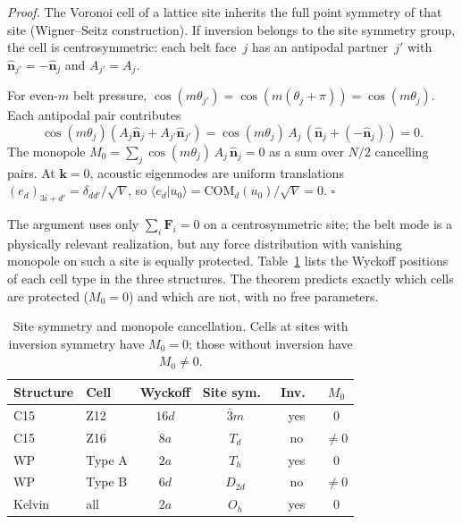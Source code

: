 \documentclass[12pt]{article}
\newcommand{\vk}{\bm{k}}
\newcommand{\vn}{\hat{\bm{n}}}
\newcommand{\vF}{\bm{F}}
\begin{document}
\emph{Proof.}  The Voronoi cell of a lattice site inherits the full
point symmetry of that site (Wigner--Seitz construction).  If
inversion belongs to the site symmetry group, the cell is
centrosymmetric: each belt face~$j$ has an antipodal partner~$j'$ with
$\vn_{j'} = -\vn_j$ and $A_{j'} = A_j$.

For even-$m$ belt pressure, $\cos(m\theta_{j'}) = \cos(m(\theta_j +
\pi)) = \cos(m\theta_j)$.  Each antipodal pair contributes
\begin{equation}
  \cos(m\theta_j)(A_j \vn_j + A_{j'} \vn_{j'})
  = \cos(m\theta_j)\, A_j\, (\vn_j + (-\vn_j)) = 0.
\end{equation}
The monopole $M_0 = \sum_{j} \cos(m\theta_j)\, A_j\, \vn_j = 0$ as a
sum over $N/2$ cancelling pairs.  At $\vk = 0$, acoustic eigenmodes
are uniform translations $(e_d)_{3i+d'} = \delta_{dd'}/\sqrt{V}$,
so $\langle e_d | u_0 \rangle = \mathrm{COM}_d(u_0)/\sqrt{V} = 0$.
\hfill$\square$

The argument uses only $\sum_i \vF_i = 0$ on a centrosymmetric site;
the belt mode is a physically relevant realization, but any force
distribution with vanishing monopole on such a site is equally
protected.  Table~\ref{tab:wyckoff} lists the Wyckoff positions of
each cell type in the three structures.  The theorem predicts exactly
which cells are protected ($M_0 = 0$) and which are not, with no free
parameters.

\begin{table}[b]
\caption{Site symmetry and monopole cancellation.  Cells at sites with
inversion symmetry have $M_0 = 0$; those without inversion have
$M_0 \neq 0$.}
\label{tab:wyckoff}
\begin{tabular}{llcccc}
\hline\hline
Structure & Cell & Wyckoff & Site sym.\ & Inv.\ & $M_0$ \\
\hline
C15 & Z12 & $16d$ & $\bar{3}m$ & yes & $0$ \\
C15 & Z16 & $8a$  & $T_d$      & no  & $\neq 0$ \\
WP  & Type A & $2a$ & $T_h$    & yes & $0$ \\
WP  & Type B & $6d$ & $D_{2d}$ & no  & $\neq 0$ \\
Kelvin & all & $2a$ & $O_h$    & yes & $0$ \\
\hline\hline
\end{tabular}
\end{table}
\end{document}
